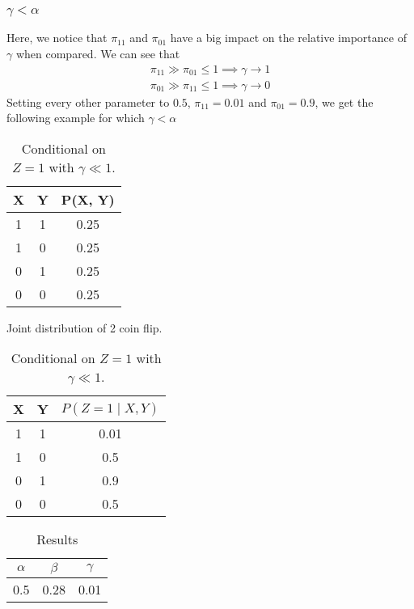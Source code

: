 \documentclass{article}
\numberwithin{equation}{section}
\theoremstyle{named}
\begin{document}
\subsubsection{$\gamma < \alpha$}
Here, we notice that $\pi_{11}$ and $\pi_{01}$ have a big impact on the relative 
importance of $\gamma$ when compared. We can see that 
\begin{align*}
        \pi_{11} \gg \pi_{01} \leq 1 \implies  \gamma \rightarrow 1 \\
        \pi_{01} \gg \pi_{11} \leq 1 \implies  \gamma \rightarrow 0
\end{align*}
Setting every other parameter to $0.5$, $\pi_{11} = 0.01$ and $\pi_{01} = 0.9$, we get 
the following example for which $\gamma < \alpha$
\renewcommand{\arraystretch}{1}
\begin{table}[H]
\begin{minipage}{.45\textwidth}
        \centering
        
        \begin{tabular}{|c|c|c|}
                \hline
                X & Y & P(X, Y) \\  \hline
                1 & 1 & 0.25 \\\hline 
                1 & 0 & 0.25 \\\hline 
                0 & 1 & 0.25 \\\hline 
                0 & 0 & 0.25 \\\hline
        \end{tabular}
        \caption{Joint distribution of 2 coin flip.}
\end{minipage}
\begin{minipage}{.45\textwidth}
        \centering
        \begin{tabular}{|c|c|c|}
                \hline
                X & Y & $P(Z = 1 \mid X, Y)$ \\\hline
                1 & 1 & 0.01 \\\hline
                1 & 0 & 0.5 \\\hline
                0 & 1 & 0.9 \\\hline
                0 & 0 & 0.5 \\\hline
        \end{tabular}
        \caption{Conditional on $Z = 1$ with $\gamma \ll 1$.}
\end{minipage}
        \label{tab:Joint1}
\end{table}

\begin{table}[H]
        \centering
        \begin{tabular}{|c|c|c|}
                \hline 
                $\alpha$ & $\beta$ & $\gamma$ \\ \hline 
                0.5 & 0.28 & 0.01 \\\hline
        \end{tabular}
        \caption{Results}
        \label{tab:Res1}
\end{table}
\end{document}
